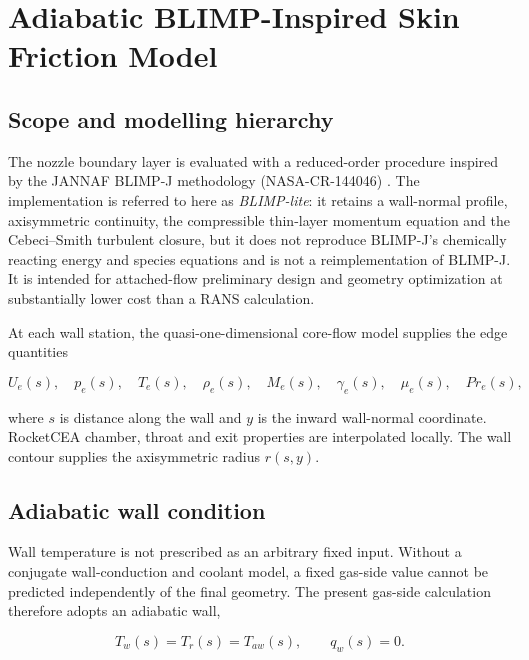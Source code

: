 \section{Adiabatic BLIMP-Inspired Skin Friction Model}
\label{sec:blimp_cebeci_smith}

\subsection{Scope and modelling hierarchy}

The nozzle boundary layer is evaluated with a reduced-order procedure inspired by
the JANNAF BLIMP-J methodology (NASA-CR-144046) \cite{BLIMPJ}. The implementation is referred to
here as \emph{BLIMP-lite}: it retains a wall-normal profile, axisymmetric continuity,
the compressible thin-layer momentum equation and the Cebeci--Smith turbulent
closure, but it does not reproduce BLIMP-J's chemically reacting energy and species
equations and is not a reimplementation of BLIMP-J. It is intended for attached-flow preliminary design and geometry
optimization at substantially lower cost than a RANS calculation.

At each wall station, the quasi-one-dimensional core-flow model supplies the edge
quantities

\begin{equation}
U_e(s),\quad p_e(s),\quad T_e(s),\quad \rho_e(s),\quad
M_e(s),\quad \gamma_e(s),\quad \mu_e(s),\quad Pr_e(s),
\end{equation}

where \(s\) is distance along the wall and \(y\) is the inward wall-normal
coordinate. RocketCEA chamber, throat and exit properties are interpolated locally.
The wall contour supplies the axisymmetric radius \(r(s,y)\).

\subsection{Adiabatic wall condition}

Wall temperature is not prescribed as an arbitrary fixed input. Without a conjugate
wall-conduction and coolant model, a fixed gas-side value cannot be predicted
independently of the final geometry. The present gas-side calculation therefore
adopts an adiabatic wall,

\begin{equation}
\boxed{T_w(s)=T_r(s)=T_{aw}(s)},
\qquad
\boxed{q_w(s)=0}.
\label{eq:blimp_adiabatic_wall}
\end{equation}

